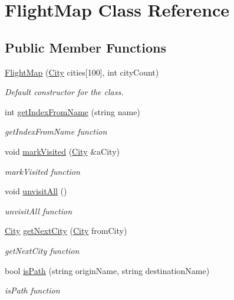 \hypertarget{class_flight_map}{}\section{Flight\+Map Class Reference}
\label{class_flight_map}
\subsection*{Public Member Functions}
\begin{DoxyCompactItemize}
\item 
\hyperlink{class_flight_map_abe6b8054568bad96d3ac09c498695306}{Flight\+Map} (\hyperlink{class_city}{City} cities\mbox{[}100\mbox{]}, int city\+Count)
\begin{DoxyCompactList}\small\item\em Default constructor for the class. \end{DoxyCompactList}\item 
int \hyperlink{class_flight_map_ac74738eb68e8390c0e5fd87effb600e4}{get\+Index\+From\+Name} (string name)
\begin{DoxyCompactList}\small\item\em get\+Index\+From\+Name function \end{DoxyCompactList}\item 
void \hyperlink{class_flight_map_ab6e4b49626a2ea60788e67d851cd721a}{mark\+Visited} (\hyperlink{class_city}{City} \&a\+City)
\begin{DoxyCompactList}\small\item\em mark\+Visited function \end{DoxyCompactList}\item 
void \hyperlink{class_flight_map_a97cfb0e508046ffb802be03496f88fc4}{unvisit\+All} ()
\begin{DoxyCompactList}\small\item\em unvisit\+All function \end{DoxyCompactList}\item 
\hyperlink{class_city}{City} \hyperlink{class_flight_map_a1bec9c3bddeadfeb909a457a574b5326}{get\+Next\+City} (\hyperlink{class_city}{City} from\+City)
\begin{DoxyCompactList}\small\item\em get\+Next\+City function \end{DoxyCompactList}\item 
bool \hyperlink{class_flight_map_a10c5a85d074c3251185a5209a2751a09}{is\+Path} (string origin\+Name, string destination\+Name)
\begin{DoxyCompactList}\small\item\em is\+Path function \end{DoxyCompactList}\end{DoxyCompactItemize}


